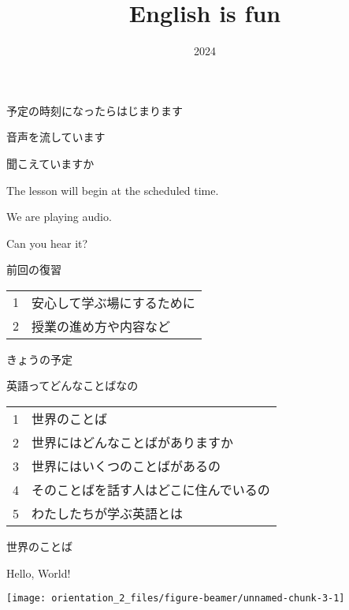 \documentclass[
  ignorenonframetext,
  aspectratio=169,
  xcolor=dvipsnames]{beamer}
\title{English is fun}
\author{}
\date{\vspace{-2.5em}2024}
\begin{document}
\frame{\titlepage}

\begin{frame}{}
\label{section}
\thispagestyle{empty}
\Large

\raggedright

予定の時刻になったらはじまります

\textbullet  音声を流しています

\textbullet  聞こえていますか　

\vfill

\raggedleft

The lesson will begin at the scheduled time.

\vspace{-6pt}

We are playing audio.

\vspace{-6pt}

Can you hear it?
\end{frame}

\begin{frame}{}
\label{section-1}
\thispagestyle{empty}
\titlepage
\end{frame}

\begin{frame}{前回の復習}
\label{ux524dux56deux306eux5fa9ux7fd2}
\thispagestyle{empty}
\LARGE

\begin{tabular}{rl}
1&安心して学ぶ場にするために\\
2&授業の進め方や内容など
\end{tabular}
\end{frame}

\begin{frame}{きょうの予定}
\label{ux304dux3087ux3046ux306eux4e88ux5b9a}
\thispagestyle{empty}
\LARGE

英語ってどんなことばなの

\bigskip

\Large
\begin{tabular}{rl}
1&世界のことば\\
2&世界にはどんなことばがありますか\\
3&世界にはいくつのことばがあるの\\
4&そのことばを話す人はどこに住んでいるの\\
5&わたしたちが学ぶ英語とは
\end{tabular}
\end{frame}

\begin{frame}{世界のことば}
\label{ux4e16ux754cux306eux3053ux3068ux3070}
\Large

Hello, World!

\texttt{[image: orientation\_2\_files/figure-beamer/unnamed-chunk-3-1]}
\end{frame}
\end{document}
